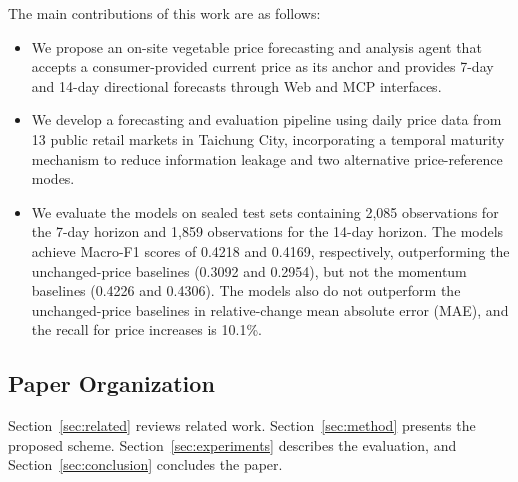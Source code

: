 The main contributions of this work are as follows:
\begin{itemize}
    \item We propose an on-site vegetable price forecasting and analysis agent that accepts a consumer-provided current price as its anchor and provides 7-day and 14-day directional forecasts through Web and MCP interfaces.
    \item We develop a forecasting and evaluation pipeline using daily price data from 13 public retail markets in Taichung City, incorporating a temporal maturity mechanism to reduce information leakage and two alternative price-reference modes.
    \item We evaluate the models on sealed test sets containing 2,085 observations for the 7-day horizon and 1,859 observations for the 14-day horizon. The models achieve Macro-F1 scores of 0.4218 and 0.4169, respectively, outperforming the unchanged-price baselines (0.3092 and 0.2954), but not the momentum baselines (0.4226 and 0.4306). The models also do not outperform the unchanged-price baselines in relative-change mean absolute error (MAE), and the recall for price increases is 10.1\%.
\end{itemize}

\subsection{Paper Organization}
Section~\ref{sec:related} reviews related work. Section~\ref{sec:method} presents the proposed scheme. Section~\ref{sec:experiments} describes the evaluation, and Section~\ref{sec:conclusion} concludes the paper.
